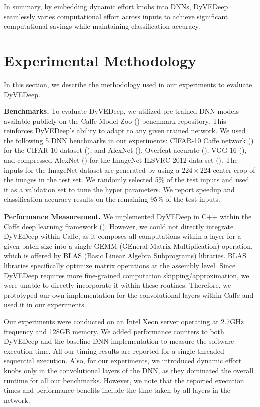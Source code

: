 \documentclass{article} %
\begin{document}
In summary, by embedding dynamic effort knobs into DNNs, DyVEDeep seamlessly varies computational effort across inputs to achieve significant computational savings while maintaining classification accuracy. 

\section{Experimental Methodology} \label{sec:exptmeth}

In this section, we describe the methodology used in our experiments to evaluate DyVEDeep.

{\bf Benchmarks.} To evaluate DyVEDeep, we utilized pre-trained DNN models available publicly on the Caffe Model Zoo (\cite{caffemodelzoo})  benchmark repository. This reinforces DyVEDeep's ability to adapt to any given trained network. We used the following 5 DNN benchmarks in our experiments: CIFAR-10 Caffe network (\cite{cifar-10network}) for the CIFAR-10 dataset (\cite{Krizhevsky09learningmultiple}), and AlexNet (\cite{NIPS2012_4824}), Overfeat-accurate (\cite{Sermanet_overfeat:integrated}), VGG-16 (\cite{DBLP:journals/corr/SimonyanZ14a}), and compressed AlexNet (\cite{DBLP:journals/corr/HanMD15}) for the ImageNet ILSVRC 2012 data set (\cite{DBLP:conf/cvpr/DengDSLL009}). The inputs for the ImageNet dataset are generated by using a $224 \times 224$ center crop of the images in the test set. We randomly selected 5\% of the test inputs and used it as a validation set to tune the hyper parameters. We report speedup and classification accuracy results on the remaining 95\% of the test inputs. 


{\bf Performance Measurement.} We implemented DyVEDeep in C++ within the Caffe deep learning framework (\cite{jia2014caffe}). However, we could not directly integrate DyVEDeep within Caffe, as it composes all computations within a layer for a given batch size into a single GEMM (GEneral Matrix Multiplication) operation, which is offered by BLAS (Basic Linear Algebra Subprograms) libraries. BLAS libraries specifically optimize matrix operations at the assembly level. Since DyVEDeep requires more fine-grained computation skipping/approximation, we were unable to directly incorporate it within these routines. Therefore, we prototyped our own implementation for the convolutional layers within Caffe and used it in our experiments.

Our experiments were conducted on an Intel Xeon server operating at 2.7GHz frequency and 128GB memory. We added performance counters to both DyVEDeep and the baseline DNN implementation to measure the software execution time. All our timing results are reported for a single-threaded sequential execution. Also, for our experiments, we introduced dynamic effort knobs only in the convolutional layers of the DNN, as they dominated the overall runtime for all our benchmarks. However, we note that the reported execution times and performance benefits include the time taken by all layers in the network.
\end{document}
